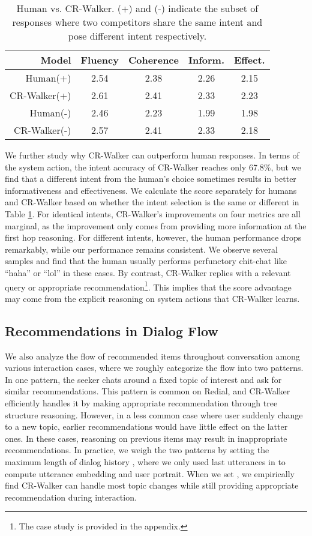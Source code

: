 \documentclass[11pt]{article}
\begin{document}
\begin{table}[tb]
    \centering
    \small
    \begin{tabular}{rcccc}\toprule
Model & Fluency & Coherence & Inform. & Effect. \\\midrule
        Human(+) & 2.54 & 2.38 & 2.26 & 2.15\\
        CR-Walker(+) & 2.61 & 2.41 & 2.33 & 2.23\\
    \midrule
        Human(-) & 2.46 & 2.23 & 1.99 & 1.98\\
        CR-Walker(-) & 2.57 & 2.41 & 2.33 & 2.18\\
    \bottomrule
    \end{tabular}
    \caption{Human vs. CR-Walker. (+) and (-) indicate the subset of responses where two competitors share the same intent and pose different intent respectively.}
    \label{tab:human_eval}
\end{table}

We further study why CR-Walker can outperform human responses. In terms of the system action, the intent accuracy of CR-Walker reaches only 67.8\%, but we find that a different intent from the human's choice sometimes results in better informativeness and effectiveness.
We calculate the score separately for humans and CR-Walker based on whether the intent selection is the same or different in Table \ref{tab:human_eval}. For identical intents, CR-Walker's improvements on four metrics are all marginal, as the improvement only comes from providing more information at the first hop reasoning. For different intents, however, the human performance drops remarkably, while our performance remains consistent. We observe several samples and find that the human usually performs perfunctory chit-chat like ``haha'' or ``lol'' in these cases. By contrast, CR-Walker replies with a relevant query or appropriate recommendation\footnote{The case study is provided in the appendix.}. This implies that the score advantage may come from the explicit reasoning on system actions that CR-Walker learns.

\subsection{Recommendations in Dialog Flow}

We also analyze the flow of recommended items throughout conversation among various interaction cases, where we roughly categorize the flow into two patterns. In one pattern, the seeker chats around a fixed topic of interest and ask for similar recommendations. This pattern is common on Redial, and CR-Walker efficiently handles it by making appropriate recommendation through tree structure reasoning. However, in a less common case where user suddenly change to a new topic, earlier recommendations would have little effect on the latter ones. In these cases, reasoning on previous items may result in inappropriate recommendations. In practice, we weigh the two patterns by setting the maximum length of dialog history , where we only used last  utterances in  to compute utterance embedding and user portrait. When we set , we empirically find CR-Walker can handle most topic changes while still providing appropriate recommendation during interaction.
\end{document}
